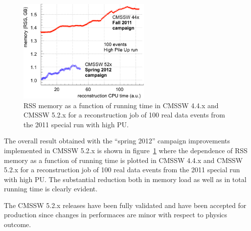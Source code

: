 \begin{figure}[b]
\includegraphics*[width=0.58\textwidth]{figs/spring12.png}\hspace{0.02\textwidth}%
\begin{minipage}[b]{0.35\textwidth}\caption{\label{fig:spring12}
 RSS memory as a
function of running time in CMSSW 4.4.x and CMSSW 5.2.x for a
reconstruction job of 100 real data events from the 2011 special
run with high PU.}
\end{minipage}
\end{figure}

The overall result obtained with the ``spring 2012'' campaign
improvements implemented in CMSSW 5.2.x is shown in
figure~\ref{fig:spring12} where the dependence of RSS memory as a
function of running time is plotted in CMSSW 4.4.x and CMSSW 5.2.x for a
reconstruction job of 100 real data events from the 2011 special
run with high PU. The substantial reduction both in memory load as
well as in total running time is clearly evident.

The CMSSW 5.2.x releases have been
fully validated and have been accepted for production since changes in
performaces are minor with respect to physics outcome.  






